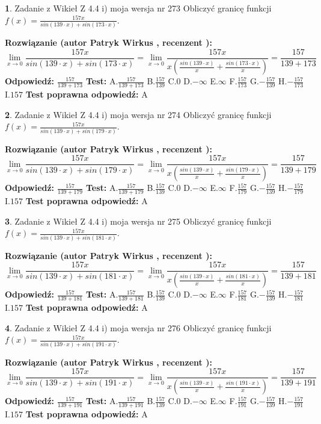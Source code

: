 \documentclass[12pt, a4paper]{article}
\theoremstyle{definition} %
\newtheorem{zad}{}
\newcommand{\zadStart}[1]{\begin{zad}#1\newline}
\newcommand{\zadStop}{\end{zad}}
\newcommand{\rozwStart}[2]{\noindent \textbf{Rozwiązanie (autor #1 , recenzent #2): }\newline}
\newcommand{\rozwStop}{\newline}
\newcommand{\odpStart}{\noindent \textbf{Odpowiedź:}\newline}
\newcommand{\odpStop}{\newline}
\newcommand{\testStart}{\noindent \textbf{Test:}\newline}
\newcommand{\testStop}{\newline}
\newcommand{\kluczStart}{\noindent \textbf{Test poprawna odpowiedź:}\newline}
\newcommand{\kluczStop}{\newline}
\begin{document}
\zadStart{Zadanie z Wikieł Z 4.4 i) moja wersja nr 273}
Obliczyć granicę funkcji $f(x)=\frac{157x}{sin(139\cdot x) +sin(173\cdot x)}$.
\zadStop
\rozwStart{Patryk Wirkus}{}
$$\lim\limits_{x\to 0}\frac{157x}{sin(139\cdot x) +sin(173\cdot x)}=\lim\limits_{x\to 0}\frac{157x}{x(\frac{sin(139\cdot x)}{x}+\frac{sin(173\cdot x)}{x})}=\frac{157}{139+173}$$
\rozwStop
\odpStart
$\frac{157}{139+173}$
\odpStop
\testStart
A.$\frac{157}{139+173}$
B.$\frac{157}{139}$
C.$0$
D.$-\infty$
E.$\infty$
F.$\frac{157}{173}$
G.$-\frac{157}{139}$
H.$-\frac{157}{173}$
I.$157$
\testStop
\kluczStart
A
\kluczStop



\zadStart{Zadanie z Wikieł Z 4.4 i) moja wersja nr 274}
Obliczyć granicę funkcji $f(x)=\frac{157x}{sin(139\cdot x) +sin(179\cdot x)}$.
\zadStop
\rozwStart{Patryk Wirkus}{}
$$\lim\limits_{x\to 0}\frac{157x}{sin(139\cdot x) +sin(179\cdot x)}=\lim\limits_{x\to 0}\frac{157x}{x(\frac{sin(139\cdot x)}{x}+\frac{sin(179\cdot x)}{x})}=\frac{157}{139+179}$$
\rozwStop
\odpStart
$\frac{157}{139+179}$
\odpStop
\testStart
A.$\frac{157}{139+179}$
B.$\frac{157}{139}$
C.$0$
D.$-\infty$
E.$\infty$
F.$\frac{157}{179}$
G.$-\frac{157}{139}$
H.$-\frac{157}{179}$
I.$157$
\testStop
\kluczStart
A
\kluczStop



\zadStart{Zadanie z Wikieł Z 4.4 i) moja wersja nr 275}
Obliczyć granicę funkcji $f(x)=\frac{157x}{sin(139\cdot x) +sin(181\cdot x)}$.
\zadStop
\rozwStart{Patryk Wirkus}{}
$$\lim\limits_{x\to 0}\frac{157x}{sin(139\cdot x) +sin(181\cdot x)}=\lim\limits_{x\to 0}\frac{157x}{x(\frac{sin(139\cdot x)}{x}+\frac{sin(181\cdot x)}{x})}=\frac{157}{139+181}$$
\rozwStop
\odpStart
$\frac{157}{139+181}$
\odpStop
\testStart
A.$\frac{157}{139+181}$
B.$\frac{157}{139}$
C.$0$
D.$-\infty$
E.$\infty$
F.$\frac{157}{181}$
G.$-\frac{157}{139}$
H.$-\frac{157}{181}$
I.$157$
\testStop
\kluczStart
A
\kluczStop



\zadStart{Zadanie z Wikieł Z 4.4 i) moja wersja nr 276}
Obliczyć granicę funkcji $f(x)=\frac{157x}{sin(139\cdot x) +sin(191\cdot x)}$.
\zadStop
\rozwStart{Patryk Wirkus}{}
$$\lim\limits_{x\to 0}\frac{157x}{sin(139\cdot x) +sin(191\cdot x)}=\lim\limits_{x\to 0}\frac{157x}{x(\frac{sin(139\cdot x)}{x}+\frac{sin(191\cdot x)}{x})}=\frac{157}{139+191}$$
\rozwStop
\odpStart
$\frac{157}{139+191}$
\odpStop
\testStart
A.$\frac{157}{139+191}$
B.$\frac{157}{139}$
C.$0$
D.$-\infty$
E.$\infty$
F.$\frac{157}{191}$
G.$-\frac{157}{139}$
H.$-\frac{157}{191}$
I.$157$
\testStop
\kluczStart
A
\kluczStop
\end{document}
